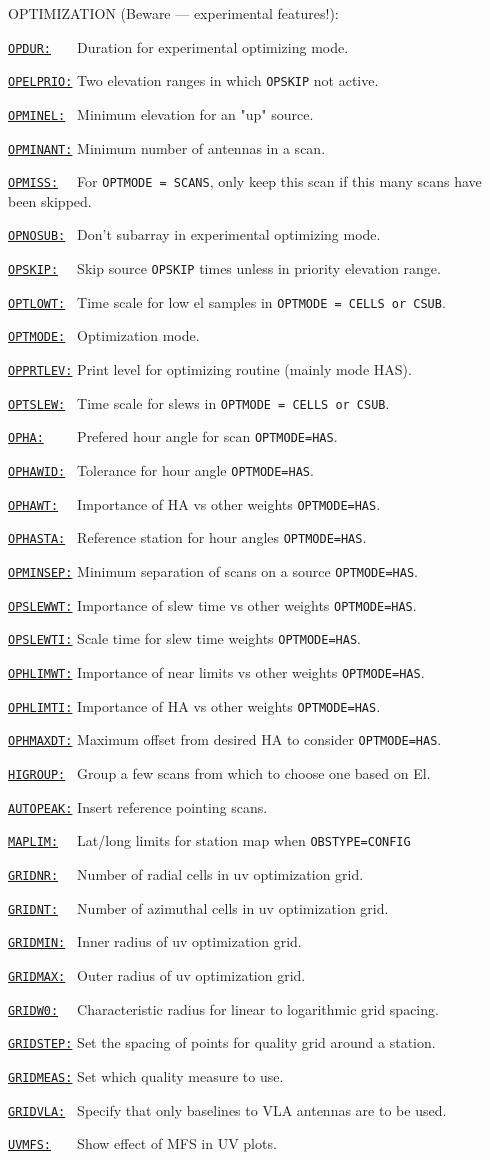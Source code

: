 \documentclass{report}
\newcommand{\htlm}[2]%
{\item
  \hyperref[MP:#1]{{\tt #1:}}{\tt #2}%
}
\begin{document}
OPTIMIZATION (Beware --- experimental features!):

\begin{list}{}{\parsep 0em  \itemsep 0em }
\htlm{OPDUR}{~~~} Duration for experimental optimizing mode.
\htlm{OPELPRIO}{} Two elevation ranges in which {\tt OPSKIP} not active.
\htlm{OPMINEL}{~} Minimum elevation for an "up" source.
\htlm{OPMINANT}{} Minimum number of antennas in a scan.
\htlm{OPMISS}{~~} For {\tt OPTMODE = SCANS}, only keep this scan
                        if this many scans have been skipped.
\htlm{OPNOSUB}{~} Don't subarray in experimental optimizing mode.
\htlm{OPSKIP}{~~} Skip source {\tt OPSKIP} times unless in
                        priority elevation range.
\htlm{OPTLOWT}{~} Time scale for low el samples in
                        {\tt OPTMODE = CELLS or CSUB}.
\htlm{OPTMODE}{~} Optimization mode.
\htlm{OPPRTLEV}{} Print level for optimizing routine (mainly mode HAS).
\htlm{OPTSLEW}{~} Time scale for slews in {\tt OPTMODE = CELLS or CSUB}.
\htlm{OPHA}{~~~~} Prefered hour angle for scan {\tt OPTMODE=HAS}.
\htlm{OPHAWID}{~} Tolerance for hour angle {\tt OPTMODE=HAS}.
\htlm{OPHAWT}{~~} Importance of HA vs other weights {\tt OPTMODE=HAS}.
\htlm{OPHASTA}{~} Reference station for hour angles {\tt OPTMODE=HAS}.
\htlm{OPMINSEP}{} Minimum separation of scans on a source {\tt OPTMODE=HAS}.
\htlm{OPSLEWWT}{} Importance of slew time vs other weights {\tt OPTMODE=HAS}.
\htlm{OPSLEWTI}{} Scale time for slew time weights {\tt OPTMODE=HAS}.
\htlm{OPHLIMWT}{} Importance of near limits vs other weights {\tt OPTMODE=HAS}.
\htlm{OPHLIMTI}{} Importance of HA vs other weights {\tt OPTMODE=HAS}.
\htlm{OPHMAXDT}{} Maximum offset from desired HA to consider {\tt OPTMODE=HAS}.
\htlm{HIGROUP}{~} Group a few scans from which to choose one based on El.
\htlm{AUTOPEAK}{} Insert reference pointing scans.
\htlm{MAPLIM}{~~} Lat/long limits for station map when {\tt OBSTYPE=CONFIG}
\htlm{GRIDNR}{~~} Number of radial cells in uv optimization grid.
\htlm{GRIDNT}{~~} Number of azimuthal cells in uv optimization grid.
\htlm{GRIDMIN}{~} Inner radius of uv optimization grid.
\htlm{GRIDMAX}{~} Outer radius of uv optimization grid.
\htlm{GRIDW0}{~~} Characteristic radius for linear to logarithmic grid spacing.
\htlm{GRIDSTEP}{} Set the spacing of points for quality grid around a station.
\htlm{GRIDMEAS}{} Set which quality measure to use.
\htlm{GRIDVLA}{~} Specify that only baselines to VLA antennas are to be used.
\htlm{UVMFS}{~~~} Show effect of MFS in UV plots.
\end{list}
\end{document}
